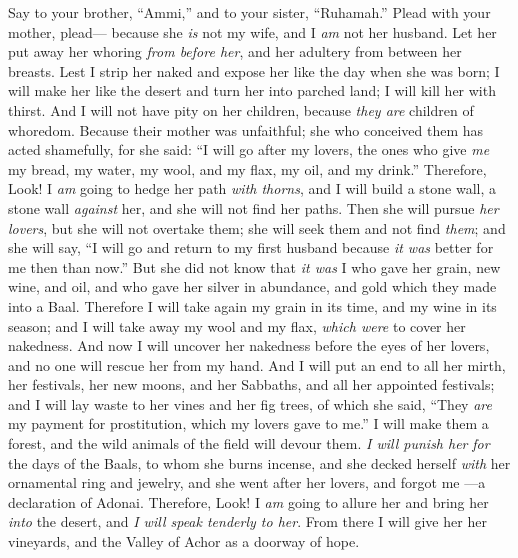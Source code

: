 \begin{biblechapter} %
 Say to your brother, “Ammi,” 
and to your sister, “Ruhamah.”
\verse Plead with your mother, plead— 
because she \textit{is} not my wife, 
and I \textit{am} not her husband. 
Let her put away her whoring \textit{from before her}, 
and her adultery from between her breasts.
\verse Lest I strip her naked 
and expose her like the day when she was born; 
I will make her like the desert 
and turn her into parched land; 
I will kill her with thirst.
\verse And I will not have pity on her children, 
because \textit{they are} children of whoredom.
\verse Because their mother was unfaithful; 
she who conceived them has acted shamefully, 
for she said: 
“I will go after my lovers, 
the ones who give \textit{me} my bread, my water, 
my wool, and my flax, 
my oil, and my drink.”
\verse Therefore, Look! 
I \textit{am} going to hedge her path \textit{with thorns}, 
and I will build a stone wall, a stone wall \textit{against} her, 
and she will not find her paths.
\verse Then she will pursue \textit{her lovers}, 
but she will not overtake them; 
she will seek them and not find \textit{them}; 
and she will say, “I will go 
and return to my first husband 
because \textit{it was} better for me then than now.”
\verse But she did not know 
that \textit{it was} I who gave her 
grain, new wine, and oil, 
and who gave her silver in abundance, 
and gold which they made into a Baal.
\verse Therefore I will take again 
my grain in its time, 
and my wine in its season; 
and I will take away my wool and my flax, 
\textit{which were} to cover her nakedness.
\verse And now I will uncover her nakedness 
before the eyes of her lovers, 
and no one will rescue her from my hand.
\verse And I will put an end to all her mirth, 
her festivals, her new moons, and her Sabbaths, 
and all her appointed festivals;
\verse and I will lay waste to her vines and her fig trees, 
of which she said, 
“They \textit{are} my payment for prostitution, 
which my lovers gave to me.” 
I will make them a forest, 
and the wild animals of the field will devour them.
\verse \textit{I will punish her} \textit{for} the days of the Baals, 
to whom she burns incense, 
and she decked herself \textit{with} her ornamental ring and jewelry, 
and she went after her lovers, and forgot me 
—a declaration of Adonai.
\verse Therefore, Look! I \textit{am} going to allure her 
and bring her \textit{into} the desert, 
and \textit{I will speak tenderly to her}.
\verse From there I will give her 
her vineyards, 
and the Valley of Achor as a doorway of hope. 

\end{biblechapter}
